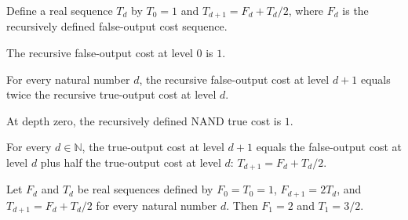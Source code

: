 \begin{definition}
\label{FABL.recursiveNandTrueCost}
\leanok
Define a real sequence $T_d$ by $T_0=1$ and $T_{d+1}=F_d+T_d/2$, where $F_d$ is the
recursively defined false-output cost sequence.
\end{definition}

\begin{theorem}
\label{FABL.recursiveNandFalseCost_zero}
\leanok
{}
The recursive false-output cost at level $0$ is $1$.
\end{theorem}

\begin{theorem}
\label{FABL.recursiveNandFalseCost_succ}
\leanok
{}
For every natural number $d$, the recursive false-output cost at level $d+1$ equals
twice the recursive true-output cost at level $d$.
\end{theorem}

\begin{theorem}
\label{FABL.recursiveNandTrueCost_zero}
\leanok
{}
At depth zero, the recursively defined NAND true cost is $1$.
\end{theorem}

\begin{theorem}
\label{FABL.recursiveNandTrueCost_succ}
\leanok
{}
For every $d\in\mathbb{N}$, the true-output cost at level $d+1$ equals the false-output
cost at level $d$ plus half the true-output cost at level $d$: $T_{d+1}=F_d+T_d/2$.
\end{theorem}

\begin{theorem}
\label{FABL.recursiveNand_costs_one}
\leanok
{}
Let $F_d$ and $T_d$ be real sequences defined by $F_0=T_0=1$, $F_{d+1}=2T_d$, and
$T_{d+1}=F_d+T_d/2$ for every natural number $d$. Then $F_1=2$ and $T_1=3/2$.
\end{theorem}

